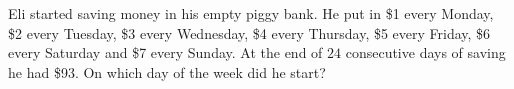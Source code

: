 Eli started saving money in his empty piggy bank. He put in \$1 every Monday, \$2 every Tuesday, \$3 every Wednesday, \$4 every Thursday, \$5 every Friday, \$6 every Saturday and \$7 every Sunday. At the end of $24$ consecutive days of saving he had \$93. On which day of the week did he start?
